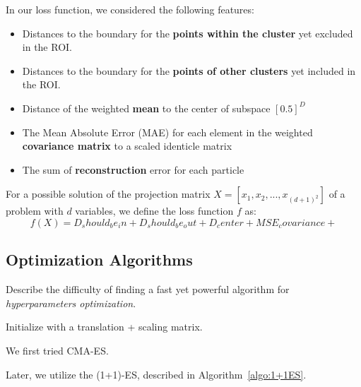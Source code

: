 In our loss function, we considered the following features:
\begin{itemize}
    \item Distances to the boundary for the \textbf{points within the cluster} yet excluded in the ROI.
    \item Distances to the boundary for the \textbf{points of other clusters} yet included in the ROI.
    \item Distance of the weighted \textbf{mean} to the center of subspace $[0.5]^D$
    \item The Mean Absolute Error (MAE) for each element in the weighted \textbf{covariance matrix} to a scaled identicle matrix
    \item The sum of \textbf{reconstruction} error for each particle 
\end{itemize} 

For a possible solution of the projection matrix $X = [x_1, x_2, ..., x_{(d+1)^2}]$ of a problem with $d$ variables, 
we define the loss function $f$ as: 
\begin{equation} 
f(X) = D_should_be_in + D_should_be_out + D_center + MSE_covariance + 
\end{equation}


\subsection{Optimization Algorithms}

Describe the difficulty of finding a fast yet powerful algorithm for \textit{hyperparameters optimization}.

Initialize with a translation + scaling matrix.

We first tried CMA-ES.

Later, we utilize the (1+1)-ES, described in Algorithm~\ref{algo:1+1ES}.


